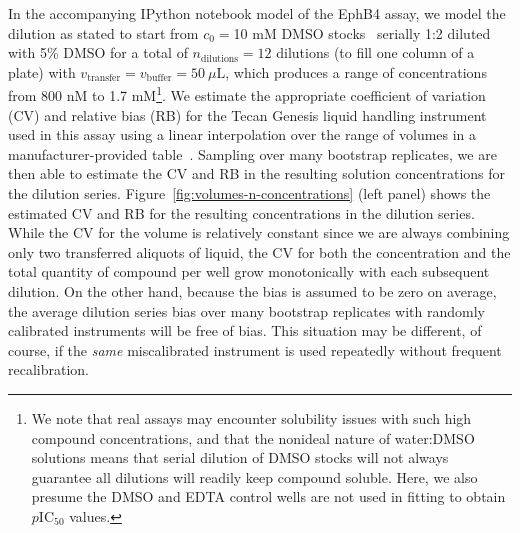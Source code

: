 \documentclass[aps,pre,twocolumn,nofootinbib,superscriptaddress,linenumbers]{revtex4-1}
\begin{document}
In the accompanying IPython notebook model of the EphB4 assay, we model the dilution as stated to start from $c_0 = $10 mM DMSO stocks~\cite{barlaam_novel_2009,barlaam_pyrimidine_2010} serially 1:2 diluted with 5\% DMSO for a total of $n_\mathrm{dilutions} = 12$ dilutions (to fill one column of a plate) with $v_\mathrm{transfer} = v_\mathrm{buffer} = 50 \: \mu\mathrm{L}$, which produces a range of concentrations from 800 nM to 1.7 mM\footnote{We note that real assays may encounter solubility issues with such high compound concentrations, and that the nonideal nature of water:DMSO solutions means that serial dilution of DMSO stocks will not always guarantee all dilutions will readily keep compound soluble.  Here, we also presume the DMSO and EDTA control wells are not used in fitting to obtain $p$IC$_{50}$ values.}.
We estimate the appropriate coefficient of variation (CV) and relative bias (RB) for the Tecan Genesis liquid handling instrument used in this assay using a linear interpolation over the range of volumes in a manufacturer-provided table~\cite{_tecan_2001}.
Sampling over many bootstrap replicates, we are then able to estimate the CV and RB in the resulting solution concentrations for the dilution series.
Figure~\ref{fig:volumes-n-concentrations} (left panel) shows the estimated CV and RB for the resulting concentrations in the dilution series.
While the CV for the volume is relatively constant since we are always combining only two transferred aliquots of liquid, the CV for both the concentration and the total quantity of compound per well grow monotonically with each subsequent dilution.
On the other hand, because the bias is assumed to be zero on average, the average dilution series bias over many bootstrap replicates with randomly calibrated instruments will be free of bias.
This situation may be different, of course, if the \emph{same} miscalibrated instrument is used repeatedly without frequent recalibration.

\end{document}
